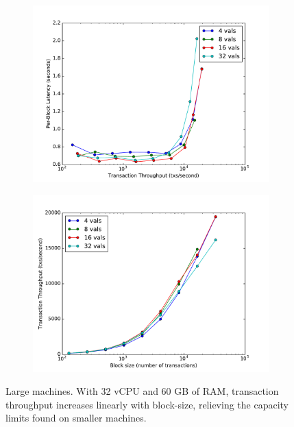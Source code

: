 \begin{figure}[]
	\centering
	\begin{subfigure}{0.8 \textwidth}
		\includegraphics[width=\linewidth,height=\textheight,keepaspectratio]{figures/throughput/large_instances/latency-throughput.pdf}
		\centering
	\end{subfigure}

	\begin{subfigure}{0.8 \textwidth}
		\includegraphics[width=\linewidth,height=\textheight,keepaspectratio]{figures/throughput/large_instances/throughput-blocksize.pdf}
	\end{subfigure}
	\centering
	\caption[Throughput-blocksize in non-faulty global network on large machines]{Large machines.
With 32 vCPU and 60 GB of RAM, transaction throughput increases linearly with block-size, 
relieving the capacity limits found on smaller machines.}
	\label{fig:exp:throughput:large}
\end{figure}


